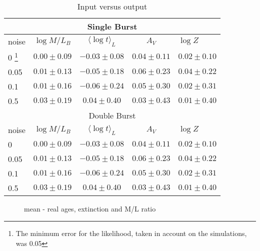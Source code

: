 \documentclass[a4paper, useAMS, usenatbib, hyperpdf]{mn2e}
\begin{document}
\begin{table}										
\begin{centering}										
\begin{tabular}{lcccl}										
\multicolumn{5}{c}{Single Burst}\\ \hline		\hline								
noise	&	$\log M/L_B$	&	$\langle \log t \rangle_L$	&	$A_V$	&	$\log Z$	\\	\hline
0 \footnote{The minimum error for the likelihood, taken in account on the simulations, was 0.05}	&	$0.00 \pm 0.09$	&	$-0.03 \pm 0.08$	&	$0.04 \pm 0.11$	&	$0.02 \pm 0.10$	\\	
0.05	&	$0.01 \pm 0.13$	&	$-0.05 \pm 0.18$	&	$0.06 \pm 0.23$	&	$0.04 \pm 0.22$	\\	
0.1	&	$0.01 \pm 0.16$	&	$-0.06 \pm 0.24$	&	$0.05 \pm 0.30$	&	$0.02 \pm 0.31$	\\	
0.5	&	$0.03 \pm 0.19$	&	$0.04 \pm 0.40$	&	$0.03 \pm 0.43$	&	$0.01 \pm 0.40$	\\	\hline
\multicolumn{5}{c}{Double Burst}\\ \hline		\hline								
noise	&	$\log M/L_B$	&	$\langle \log t \rangle_L$	&	$A_V$	&	$\log Z$	\\	\hline
0	&	$0.00 \pm 0.09$	&	$-0.03 \pm 0.08$	&	$0.04 \pm 0.11$	&	$0.02 \pm 0.10$	\\	
0.05	&	$0.01 \pm 0.13$	&	$-0.05 \pm 0.18$	&	$0.06 \pm 0.23$	&	$0.04 \pm 0.22$	\\	
0.1	&	$0.01 \pm 0.16$	&	$-0.06 \pm 0.24$	&	$0.05 \pm 0.30$	&	$0.02 \pm 0.31$	\\	
0.5	&	$0.03 \pm 0.19$	&	$0.04 \pm 0.40$	&	$0.03 \pm 0.43$	&	$0.01 \pm 0.40$	\\	
										
										
\hline										
\end{tabular}										
\end{centering}										
\caption{Input versus output}										
\label{tab:InXOut}										
\end{table}										


\begin{figure}
\label{fig:inout}
\caption{mean - real ages, extinction and M/L ratio}
\end{figure}
\end{document}

